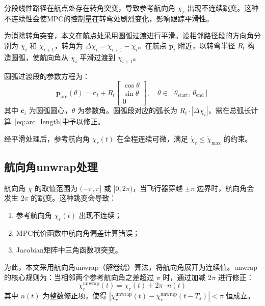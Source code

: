 分段线性路径在航点处存在转角突变，导致参考航向角 $\chi_r$ 出现不连续跳变。这种不连续性会使MPC的控制量在转弯处剧烈变化，影响跟踪平滑性。

为消除转角突变，本文在航点处采用圆弧过渡进行平滑。设相邻路径段的方向角分别为 $\chi_i$ 和 $\chi_{i+1}$，转角为 $\Delta\chi_i = \chi_{i+1} - \chi_i$。在航点 $\mathbf{p}_i$ 附近，以转弯半径 $R_t$ 构造圆弧，使航向角从 $\chi_i$ 平滑过渡到 $\chi_{i+1}$。

圆弧过渡段的参数方程为：
\begin{equation}\label{eq:smooth_arc}
\mathbf{p}_{\text{arc}}(\theta) = \mathbf{c}_i + R_t \begin{bmatrix} \cos\theta \\ \sin\theta \\ 0 \end{bmatrix}, \quad \theta \in [\theta_{\text{start}},\, \theta_{\text{end}}]
\end{equation}
其中 $\mathbf{c}_i$ 为圆弧圆心，$\theta$ 为参数角。圆弧段对应的弧长为 $R_t \cdot |\Delta\chi_i|$，需在总弧长计算~\eqref{eq:arc_length}中予以修正。

经平滑处理后，参考航向角 $\chi_r(t)$ 在全程连续可微，满足 $\dot{\chi}_r \leq \dot{\chi}_{\max}$ 的约束。

\subsection{航向角unwrap处理}\label{sec:unwrap}

航向角 $\chi$ 的取值范围为 $(-\pi, \pi]$ 或 $[0, 2\pi)$，当飞行器穿越 $\pm\pi$ 边界时，航向角会发生 $2\pi$ 的跳变。这种跳变会导致：
\begin{enumerate}[leftmargin=*]
    \item 参考航向角 $\chi_r(t)$ 出现不连续；
    \item MPC代价函数中航向角偏差计算错误；
    \item Jacobian矩阵中三角函数项突变。
\end{enumerate}

为此，本文采用航向角unwrap（解卷绕）算法，将航向角展开为连续值。unwrap的核心规则为：当相邻两个参考航向角之差超过 $\pi$ 时，通过加减 $2\pi$ 进行修正：
\begin{equation}\label{eq:unwrap}
\chi_r^{\text{unwrap}}(t) = \chi_r(t) + 2\pi \cdot n(t)
\end{equation}
其中 $n(t)$ 为整数修正项，使得 $|\chi_r^{\text{unwrap}}(t) - \chi_r^{\text{unwrap}}(t - T_s)| < \pi$ 恒成立。

